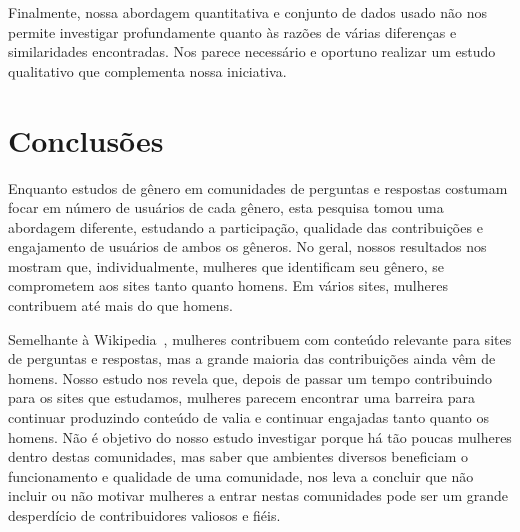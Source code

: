 
Finalmente, nossa abordagem quantitativa e conjunto de dados usado não nos permite investigar profundamente quanto às razões de várias diferenças e similaridades encontradas. Nos parece necessário e oportuno realizar um estudo qualitativo que complementa nossa iniciativa.

\chapter{Conclusões}


Enquanto estudos de gênero em comunidades de perguntas e respostas costumam focar em número de usuários de cada gênero, esta pesquisa tomou uma abordagem diferente, estudando a participação, qualidade das contribuições e engajamento de usuários de ambos os gêneros. No geral, nossos resultados nos mostram que, individualmente, mulheres que identificam seu gênero, se comprometem aos sites tanto quanto homens. Em vários sites, mulheres contribuem até mais do que homens.


Semelhante à Wikipedia~\cite{lam2011wp}, mulheres contribuem com conteúdo relevante para sites de perguntas e respostas, mas a grande maioria das contribuições ainda vêm de homens. Nosso estudo nos revela que, depois de passar um tempo contribuindo para os sites que estudamos, mulheres parecem encontrar uma barreira para continuar produzindo conteúdo de valia e continuar engajadas tanto quanto os homens. Não é objetivo do nosso estudo investigar porque há tão poucas mulheres dentro destas comunidades, mas saber que ambientes diversos beneficiam o funcionamento e qualidade de uma comunidade, nos leva a concluir que não incluir ou não motivar mulheres a entrar nestas comunidades pode ser um grande desperdício de contribuidores valiosos e fiéis.

